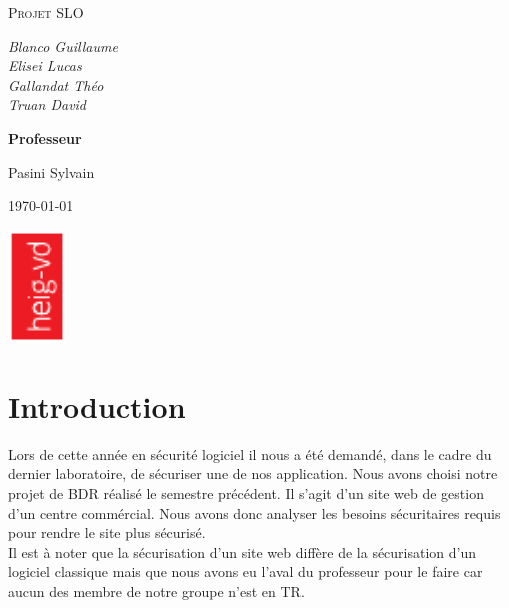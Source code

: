 \documentclass[a4paper]{article}
\date{\today}
\begin{document}
\thispagestyle{empty}

\begin{titlepage}
\center

    \vspace{1cm}
    {\scshape\LARGE Projet SLO \\ 
        \vspace{0.5cm}}

    \vspace{0.5cm}
    {\itshape Blanco Guillaume \\ Elisei Lucas \\ Gallandat Théo  \\ Truan David\par}

    \vspace{1cm}
    \textbf{Professeur}\par
    Pasini Sylvain\par
    \vspace{3cm}

    {\large \today\par}
    \vspace{3cm}
    \includegraphics[height=3cm,angle=-90]{img/logo-HEIG-VD.pdf}
\end{titlepage}
\setcounter{page}{1}
\section{Introduction}
Lors de cette année en sécurité logiciel il nous a été demandé, dans le cadre du dernier laboratoire, de sécuriser une de nos application. Nous avons choisi notre projet de BDR réalisé le semestre précédent. Il s'agit d'un site web de gestion d'un centre commércial. Nous avons donc analyser les besoins sécuritaires requis pour rendre le site plus sécurisé.\\
Il est à noter que la sécurisation d'un site web diffère de la sécurisation d'un logiciel classique mais que nous avons eu l'aval du professeur pour le faire car aucun des membre de notre groupe n'est en TR.
\end{document}
